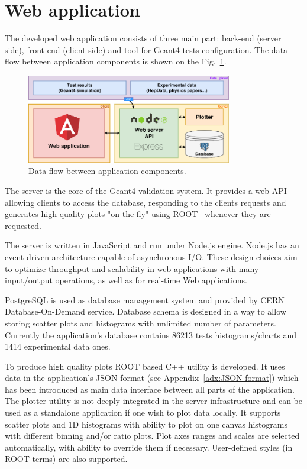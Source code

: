 \section{Web application}
\label{sec-webapplication}

The developed web application consists of three main part: back-end (server side), front-end (client side) and tool 
for Geant4 tests configuration. The data flow between application components is shown on the Fig.~\ref{fig:dataflow}.

\begin{figure}[h]
    \centering
    \includegraphics[width=0.8\textwidth,clip]{schema.png}
    \caption{Data flow between application components.}
    \label{fig:dataflow}
\end{figure}

The server is the core of the Geant4 validation system. It provides a web API allowing clients to access the database, responding to the clients requests and generates high quality plots "on the fly" using ROOT~\cite{ROOT} whenever they are requested.

The server is written in JavaScript and run under Node.js engine. Node.js has an event-driven architecture capable of asynchronous I/O. These design choices aim to optimize throughput and scalability in web applications with many input/output operations, as well as for real-time Web applications.

PostgreSQL is used as database management system and provided by CERN Database-On-Demand service. Database schema is designed in a way to allow storing scatter plots and histograms with unlimited number of parameters. Currently the application's database contains 86213 tests histograms/charts and 1414 experimental data ones.

To produce high quality plots ROOT based C++ utility is developed. It uses data in the application's JSON format (see Appendix~\ref{adx:JSON-format}) which has been introduced as main data interface between all parts of the application. The plotter utility is not deeply integrated in the server infrastructure and can be used as a standalone application if one wish to plot data locally. It supports scatter plots and 1D histograms with ability to plot on one canvas histograms with different binning and/or ratio plots. Plot axes ranges and scales are selected automatically, with ability to override them if necessary. User-defined styles (in ROOT terms) are also supported.

